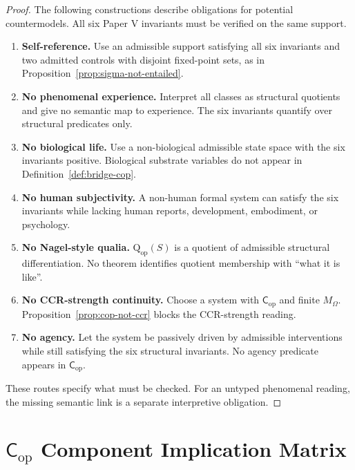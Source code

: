 \documentclass[11pt,a4paper]{article}
\theoremstyle{definition}
\newcommand{\Cop}{\mathsf{C}_{\mathrm{op}}}
\newcommand{\Qop}{\mathrm{Q}_{\mathrm{op}}}
\newcommand{\MO}{M_\Omega}
\begin{document}
\begin{proof}
The following constructions describe obligations for potential countermodels. All six Paper V invariants must be verified on the same support.
\begin{enumerate}[leftmargin=1.5em]
\item \textbf{Self-reference.} Use an admissible support satisfying all six invariants and two admitted controls with disjoint fixed-point sets, as in Proposition~\ref{prop:sigma-not-entailed}.
\item \textbf{No phenomenal experience.} Interpret all classes as structural
quotients and give no semantic map to experience. The six invariants quantify
over structural predicates only.
\item \textbf{No biological life.} Use a non-biological admissible state space
with the six invariants positive. Biological substrate variables do not appear
in Definition~\ref{def:bridge-cop}.
\item \textbf{No human subjectivity.} A non-human formal system can satisfy the
six invariants while lacking human reports, development, embodiment, or
psychology.
\item \textbf{No Nagel-style qualia.} $\Qop(S)$ is a quotient of admissible
structural differentiation. No theorem identifies quotient membership with
``what it is like''.
\item \textbf{No CCR-strength continuity.} Choose a system with $\Cop$ and
finite $\MO$. Proposition~\ref{prop:cop-not-ccr} blocks the CCR-strength
reading.
\item \textbf{No agency.} Let the system be passively driven by admissible
interventions while still satisfying the six structural invariants. No agency
predicate appears in $\Cop$.
\end{enumerate}
These routes specify what must be checked. For an untyped phenomenal reading, the missing semantic link is a separate interpretive obligation.
\end{proof}

\section{\texorpdfstring{$\Cop$ Component Implication Matrix}{Cop Component Implication Matrix}}
\end{document}
